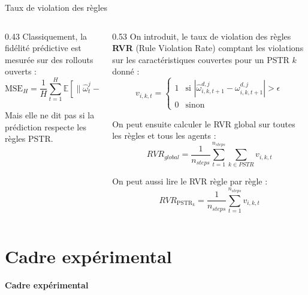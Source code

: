 \documentclass[aspectratio=169]{beamer}
\newcommand{\SectionTransitionFrame}[1]{%
  \begin{frame}[plain]
    \centering
    \vfill
    {\Huge\bfseries #1\par}
    \vfill
  \end{frame}
}
\begin{document}
\begin{frame}{Taux de violation des règles}
  \setlength{\abovedisplayskip}{2pt}
  \setlength{\belowdisplayskip}{2pt}
  \begin{columns}[T,totalwidth=\textwidth]
    \begin{column}{0.43\textwidth}
      \vspace{1.7cm}
      \scriptsize
      Classiquement, la fidélité prédictive est mesurée sur des rollouts ouverts :
      \[
        \text{MSE}_H =
        \frac{1}{H}
        \sum_{t=1}^{H}
        \mathbb{E}\left[
          \|\hat{\omega}^j_t - \omega^j_t\|^2
          \right]
      \]

      \vspace{0.1cm}
      Mais elle ne dit pas si la prédiction respecte les règles PSTR.
    \end{column}
    \begin{column}{0.53\textwidth}
      \scriptsize
      On introduit, le taux de violation des règles \textbf{RVR}
      (Rule Violation Rate) comptant les violations sur les caractéristiques couvertes pour un PSTR $k$ donné :
      \[
        v_{i,k,t} =
        \begin{cases}
          1 & \text{si } |\hat{\omega}^{d,j}_{i,k,t+1} - \omega^{d,j}_{i,k,t+1}| > \epsilon \\
          0 & \text{sinon}
        \end{cases}
      \]

      \vspace{0.7cm}
      On peut ensuite calculer le RVR global sur toutes les règles et tous les agents :
      \[
        RVR_{global} =
        \frac{1}{n_{steps}}\sum_{t=1}^{n_{steps}}\sum_{k \in PSTR} v_{i,k,t}
      \]

      \vspace{0.27cm}
      On peut aussi lire le RVR règle par règle :
      \[
        RVR_{\text{PSTR}_k} = \frac{1}{n_{steps}}\sum_{t=1}^{n_{steps}} v_{i,k,t}
      \]

    \end{column}
  \end{columns}
\end{frame}

\section{Cadre expérimental}

\SectionTransitionFrame{Cadre expérimental}
\end{document}
